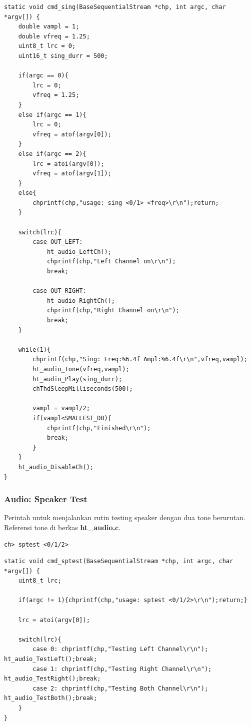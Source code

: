 \documentclass[12pt,]{article}
\begin{document}
	\begin{verbatim}
static void cmd_sing(BaseSequentialStream *chp, int argc, char *argv[]) {
	double vampl = 1;
	double vfreq = 1.25;
	uint8_t lrc = 0;
	uint16_t sing_durr = 500;
	
	if(argc == 0){
		lrc = 0;
		vfreq = 1.25;
	}
	else if(argc == 1){
		lrc = 0;
		vfreq = atof(argv[0]);
	}
	else if(argc == 2){
		lrc = atoi(argv[0]);
		vfreq = atof(argv[1]);
	}
	else{
		chprintf(chp,"usage: sing <0/1> <freq>\r\n");return;
	}
	
	switch(lrc){
		case OUT_LEFT:
			ht_audio_LeftCh();
			chprintf(chp,"Left Channel on\r\n");
			break;
			
		case OUT_RIGHT:
			ht_audio_RightCh();
			chprintf(chp,"Right Channel on\r\n");
			break;
	}
	
	while(1){
		chprintf(chp,"Sing: Freq:%6.4f Ampl:%6.4f\r\n",vfreq,vampl);
		ht_audio_Tone(vfreq,vampl);
		ht_audio_Play(sing_durr);
		chThdSleepMilliseconds(500);
		
		vampl = vampl/2;
		if(vampl<SMALLEST_DB){
			chprintf(chp,"Finished\r\n");
			break;
		}
	}
	ht_audio_DisableCh();
}
	\end{verbatim}
	
	\newpage
	\subsubsection{Audio: Speaker Test}
	Perintah untuk menjalankan rutin testing speaker dengan dua tone berurutan.
	Referensi tone di berkas \textbf{ht\_audio.c}.
	\begin{verbatim}
ch> sptest <0/1/2>
	\end{verbatim}
	
	\begin{verbatim}
static void cmd_sptest(BaseSequentialStream *chp, int argc, char *argv[]) {
	uint8_t lrc;
	
	if(argc != 1){chprintf(chp,"usage: sptest <0/1/2>\r\n");return;}
	
	lrc = atoi(argv[0]);
	
	switch(lrc){
		case 0: chprintf(chp,"Testing Left Channel\r\n"); ht_audio_TestLeft();break;
		case 1: chprintf(chp,"Testing Right Channel\r\n"); ht_audio_TestRight();break;
		case 2: chprintf(chp,"Testing Both Channel\r\n"); ht_audio_TestBoth();break;
	}
}
	\end{verbatim}
	
\end{document}
